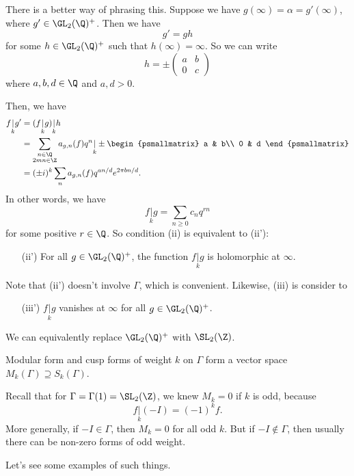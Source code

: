 \documentclass[a4paper]{article}
\begin{document}
\separator

There is a better way of phrasing this. Suppose we have $g(\infty) = \alpha = g'(\infty)$, where $g' \in \GL_2(\Q)^+$. Then we have
\[
  g' = gh
\]
for some $h \in \GL_2(\Q)^+$ such that $h(\infty) = \infty$. So we can write
\[
  h = \pm
  \begin{pmatrix}
    a & b\\
    0 & c
  \end{pmatrix}
\]
where $a, b, d \in \Q$ and $a, d > 0$.

Then, we have
\begin{align*}
  f\underset{k}{|} g' &= (f \underset{k}{|} g) \underset{k}{|} h \\
  &= \sum_{\substack{n \in \Q \\ 2mn \in \Z}} a_{g, n} (f) q^n \underset{k}{|} \pm
  \begin{psmallmatrix}
    a & b\\
    0 & d
  \end{psmallmatrix}\\
  &= (\pm i)^k \sum_n a_{g, n} (f) q^{an/d} e^{2\pi bn/d}.
\end{align*}
In other words, we have
\[
  f\underset{k}{|} g = \sum_{n \geq 0} c_n q^{rn}
\]
for some positive $r \in \Q$. So condition (ii) is equivalent to (ii'):
\begin{enumerate}
  \item[(ii')] For all $g \in \GL_2(\Q)^+$, the function $f\underset{k}{|} g$ is holomorphic at $\infty$.
\end{enumerate}

Note that (ii') doesn't involve $\Gamma$, which is convenient. Likewise, (iii) is consider to
\begin{enumerate}
  \item[(iii')] $f\underset{k}{|} g$ vanishes at $\infty$ for all $g \in \GL_2(\Q)^+$.
\end{enumerate}
We can equivalently replace $\GL_2(\Q)^+$ with $\SL_2(\Z)$.

Modular form and cusp forms of weight $k$ on $\Gamma$ form a vector space $M_k(\Gamma) \supseteq S_k(\Gamma)$.

Recall that for $\Gamma = \Gamma(1) = \SL_2(\Z)$, we knew $M_k = 0$ if $k$ is odd, because
\[
  f\underset{k}{|} (-I) = (-1)^k f.
\]
More generally, if $-I \in \Gamma$, then $M_k = 0$ for all odd $k$. But if $-I \not\in \Gamma$, then usually there can be non-zero forms of odd weight.

Let's see some examples of such things.
\end{document}
